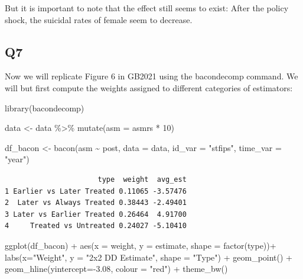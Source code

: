 \documentclass[
  letterpaper,
  DIV=11,
  numbers=noendperiod]{scrartcl}
\newenvironment{Shaded}{\begin{snugshade}}{\end{snugshade}}
\newcommand{\AttributeTok}[1]{\textcolor[rgb]{0.40,0.45,0.13}{#1}}
\newcommand{\DecValTok}[1]{\textcolor[rgb]{0.68,0.00,0.00}{#1}}
\newcommand{\FloatTok}[1]{\textcolor[rgb]{0.68,0.00,0.00}{#1}}
\newcommand{\FunctionTok}[1]{\textcolor[rgb]{0.28,0.35,0.67}{#1}}
\newcommand{\NormalTok}[1]{\textcolor[rgb]{0.00,0.23,0.31}{#1}}
\newcommand{\OtherTok}[1]{\textcolor[rgb]{0.00,0.23,0.31}{#1}}
\newcommand{\SpecialCharTok}[1]{\textcolor[rgb]{0.37,0.37,0.37}{#1}}
\newcommand{\StringTok}[1]{\textcolor[rgb]{0.13,0.47,0.30}{#1}}
\begin{document}
But it is important to note that the effect still seems to exist: After
the policy shock, the suicidal rates of female seem to decrease.

\subsection{Q7}\label{q7}

Now we will replicate Figure 6 in GB2021 using the bacondecomp command.
We will but first compute the weights assigned to different categories
of estimators:

\begin{Shaded}
\begin{Highlighting}[]
\FunctionTok{library}\NormalTok{(bacondecomp)}

\NormalTok{data }\OtherTok{\textless{}{-}}\NormalTok{ data }\SpecialCharTok{\%\textgreater{}\%} \FunctionTok{mutate}\NormalTok{(}\AttributeTok{asm =}\NormalTok{ asmrs }\SpecialCharTok{*} \DecValTok{10}\NormalTok{)}

\NormalTok{df\_bacon }\OtherTok{\textless{}{-}} \FunctionTok{bacon}\NormalTok{(asm }\SpecialCharTok{\textasciitilde{}}\NormalTok{ post,}
            \AttributeTok{data =}\NormalTok{ data,}
            \AttributeTok{id\_var =} \StringTok{"stfips"}\NormalTok{,}
            \AttributeTok{time\_var =} \StringTok{"year"}\NormalTok{)}
\end{Highlighting}
\end{Shaded}

\begin{verbatim}
                      type  weight  avg_est
1 Earlier vs Later Treated 0.11065 -3.57476
2  Later vs Always Treated 0.38443 -2.49401
3 Later vs Earlier Treated 0.26464  4.91700
4     Treated vs Untreated 0.24027 -5.10410
\end{verbatim}

\begin{Shaded}
\begin{Highlighting}[]
\FunctionTok{ggplot}\NormalTok{(df\_bacon) }\SpecialCharTok{+}
  \FunctionTok{aes}\NormalTok{(}\AttributeTok{x =}\NormalTok{ weight, }\AttributeTok{y =}\NormalTok{ estimate, }\AttributeTok{shape =} \FunctionTok{factor}\NormalTok{(type))}\SpecialCharTok{+}
  \FunctionTok{labs}\NormalTok{(}\AttributeTok{x=}\StringTok{"Weight"}\NormalTok{, }\AttributeTok{y =} \StringTok{"2x2 DD Estimate"}\NormalTok{, }\AttributeTok{shape =} \StringTok{"Type"}\NormalTok{) }\SpecialCharTok{+}
  \FunctionTok{geom\_point}\NormalTok{() }\SpecialCharTok{+}
  \FunctionTok{geom\_hline}\NormalTok{(}\AttributeTok{yintercept=}\SpecialCharTok{{-}}\FloatTok{3.08}\NormalTok{, }\AttributeTok{colour =} \StringTok{"red"}\NormalTok{) }\SpecialCharTok{+}
  \FunctionTok{theme\_bw}\NormalTok{()}
\end{Highlighting}
\end{Shaded}
\end{document}
